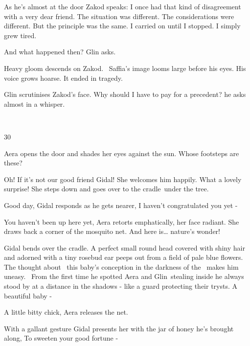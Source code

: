 \documentclass[letterpaper]{article}
\begin{document}
As he's almost at the door Zakod speaks: {\textquotedbl}I once had that kind of disagreement with a very dear friend.
The situation was different. The considerations were different. But the principle was the same. I carried on until I
stopped. I simply\textcolor[rgb]{0.0,0.4392157,0.7529412}{ }grew tired.{\textquotedbl} 

{\textquotedbl}And what happened then?{\textquotedbl} Glin asks. 

Heavy gloom descends on Zakod. \ Saffia's image looms large before his eyes. His voice grows hoarse. {\textquotedbl}It
ended in tragedy.{\textquotedbl} 

Glin scrutinises Zakod's face. {\textquotedbl}Why should\textcolor[rgb]{0.0,0.4392157,0.7529412}{ }I have to pay for a
precedent?{\textquotedbl} he asks almost in a whisper.

~

30~~ 

Aera opens the door and shades her eyes against the sun. Whose footsteps are these? 

{\textquotedbl}Oh! If it's not our good friend Gidal!{\textquotedbl} She welcomes him happily. {\textquotedbl}What a
lovely surprise!{\textquotedbl} She steps down and goes over to the
cradle~under\textcolor[rgb]{0.0,0.4392157,0.7529412}{ }the tree. 

{\textquotedbl}Good day,{\textquotedbl} Gidal responds as he gets nearer, {\textquotedbl}I haven't congratulated you yet
-{\textquotedbl} 

{\textquotedbl}You haven't been up here yet,{\textquotedbl} Aera retorts emphatically, her face radiant. She draws back
a corner of the mosquito net. {\textquotedbl}And here is{\dots} nature's wonder!{\textquotedbl} ~

Gidal bends over the cradle. A perfect small round head covered with shiny hair and adorned with a tiny rosebud ear
peeps out from a field of pale blue flowers. The thought about \ this baby's conception in the darkness of the \ makes
him uneasy. ~From the first time he spotted Aera and Glin~stealing inside he always stood by at a distance in the
shadows - like a guard protecting their trysts. {\textquotedbl}A beautiful baby -{\textquotedbl} 

{\textquotedbl}A little bitty chick,{\textquotedbl} Aera releases the net. 

With a gallant gesture Gidal presents her with the jar of honey he's brought along, {\textquotedbl}To sweeten your good
fortune -{\textquotedbl} 
\end{document}
